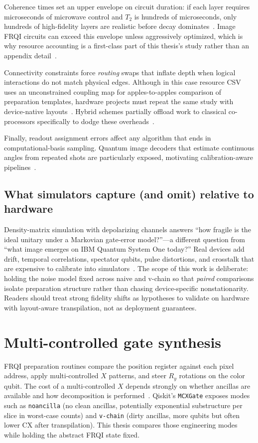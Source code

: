 Coherence times set an upper envelope on circuit duration: if each layer requires microseconds of microwave control and $T_2$ is hundreds of microseconds, only hundreds of high-fidelity layers are realistic before decay dominates~\cite{Preskill2018NISQ}. Image FRQI circuits can exceed this envelope unless aggressively optimized, which is why resource accounting is a first-class part of this thesis's study rather than an appendix detail~\cite{Geng2023ImprovedFRQI}.

Connectivity constraints force \emph{routing} swaps that inflate depth when logical interactions do not match physical edges. Although in this case resource CSV uses an unconstrained coupling map for apples-to-apples comparison of preparation templates, hardware projects must repeat the same study with device-native layouts~\cite{Geng2022HybridNISQEdge}. Hybrid schemes partially offload work to classical co-processors specifically to dodge these overheads~\cite{Geng2022HybridNISQEdge}.

Finally, readout assignment errors affect any algorithm that ends in computational-basis sampling. Quantum image decoders that estimate continuous angles from repeated shots are particularly exposed, motivating calibration-aware pipelines~\cite{Mu2025GuidedImageFiltering}.

\subsection{What simulators capture (and omit) relative to hardware}
Density-matrix simulation with depolarizing channels answers ``how fragile is the ideal unitary under a Markovian gate-error model?''---a different question from ``what image emerges on IBM Quantum System One today?'' Real devices add drift, temporal correlations, spectator qubits, pulse distortions, and crosstalk that are expensive to calibrate into simulators~\cite{Preskill2018NISQ,Geng2023ImprovedFRQI}. The scope of this work is deliberate: holding the noise model fixed across naive and v-chain so that \emph{paired} comparisons isolate preparation structure rather than chasing device-specific nonstationarity. Readers should treat strong fidelity shifts as hypotheses to validate on hardware with layout-aware transpilation, not as deployment guarantees.

\section{Multi-controlled gate synthesis}
FRQI preparation routines compare the position register against each pixel address, apply multi-controlled $X$ patterns, and steer $R_y$ rotations on the color qubit. The cost of a multi-controlled $X$ depends strongly on whether ancillas are available and how decomposition is performed~\cite{Vale2023MCSU2,Azevedo2024LowDepthMCG,Arsoski2024MCXQFT,Zindorf2024EfficientMCG}. Qiskit's \texttt{MCXGate} exposes modes such as \texttt{noancilla} (no clean ancillas, potentially exponential substructure per slice in worst-case counts) and \texttt{v-chain} (dirty ancillas, more qubits but often lower CX after transpilation). This thesis compares those engineering modes while holding the abstract FRQI state fixed.

